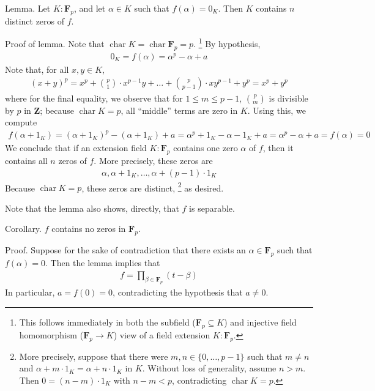 \documentclass[oneside, english, 11pt]{article}
\newcommand{\fontField}[1]{\mathbf{#1}}
\DeclareMathOperator{\characteristic}{char}
\newcommand{\F}{\fontField{F}}
\newcommand{\integers}{\fontField{Z}}
\newcommand{\Z}{\integers}
\begin{document}
Lemma. Let $K : \F_{p}$, and let $\alpha \in K$ such that $f(\alpha) = 0_{K}$. Then $K$ contains $n$ distinct zeros of $f$.

Proof of lemma. Note that $\characteristic K = \characteristic \F_{p} = p$.%
\footnote{This follows immediately in both the subfield ($\F_{p} \subseteq K$) and injective field homomorphism ($\F_{p} \rightarrow K$) view of a field extension $K : \F_{p}$.} %
By hypothesis,
\begin{align*}
0_{K}
=
f(\alpha)
=
\alpha^{p} - \alpha + a
\end{align*}
Note that, for all $x, y \in K$,
\begin{align*}
(x + y)^{p}
=
x^{p} + {p \choose 1} \cdot x^{p - 1} y + \ldots + {p \choose p - 1} \cdot x y^{p - 1} + y^{p}
=
x^{p} + y^{p}
\end{align*}
where for the final equality, we observe that for $1 \leq m \leq p - 1$, ${p \choose m}$ is divisible by $p$ in $\Z$; because $\characteristic K = p$, all ``middle'' terms are zero in $K$. Using this, we compute
\begin{align*}
f(\alpha + 1_{K})
=
(\alpha + 1_{K})^{p} - (\alpha + 1_{K}) + a
=
\alpha^{p} + 1_{K} - \alpha - 1_{K} + a
=
\alpha^{p} - \alpha + a
=
f(\alpha)
=
0
\end{align*}
We conclude that if an extension field $K : \F_{p}$ contains one zero $\alpha$ of $f$, then it contains all $n$ zeros of $f$. More precisely, these zeros are
\begin{align*}
\alpha, \alpha + 1_{K}, \ldots, \alpha + (p - 1) \cdot 1_{K}
\end{align*}
Because $\characteristic K = p$, these zeros are distinct,%
\footnote{More precisely, suppose that there were $m, n \in \{0, \ldots, p - 1\}$ such that $m \neq n$ and $\alpha + m \cdot 1_{K} = \alpha + n \cdot 1_{K}$ in $K$. Without loss of generality, assume $n > m$. Then $0 = (n - m) \cdot 1_{K}$ with $n - m < p$, contradicting $\characteristic K = p$.} %
as desired.

Note that the lemma also shows, directly, that $f$ is separable.

Corollary. $f$ contains no zeros in $\F_{p}$.

Proof. Suppose for the sake of contradiction that there exists an $\alpha \in \F_{p}$ such that $f(\alpha) = 0$. Then the lemma implies that
\begin{align*}
f
=
\prod_{\beta \in \F_{p}} (t - \beta)
\end{align*}
In particular, $a = f(0) = 0$, contradicting the hypothesis that $a \neq 0$.
\end{document}
